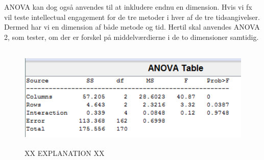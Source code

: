 ANOVA kan dog også anvendes til at inkludere endnu en dimension. Hvis vi fx vil teste intellectual engagement for de tre metoder i hver af de tre tidsangivelser. Dermed har vi en dimension af både metode og tid. Hertil skal anvendes ANOVA 2, som tester, om der er forskel på middelværdierne i de to dimensioner samtidig.

\begin{figure}[t]
	\begin{center}
		\includegraphics[height=5cm]{fig/anova2_testvalue.png}
		\caption{XX EXPLANATION XX}
		\label{ANOVA_2}
	\end{center}
\end{figure}

